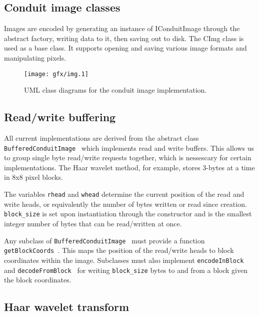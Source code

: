 \FloatBarrier
\subsection{Conduit image classes}

Images are encoded by generating an instance of IConduitImage through the abstract factory, writing data to it, then saving out to disk. The CImg class is used as a base class. It supports opening and saving various image formats and manipulating pixels.

    \begin{figure}[tbp]
        \begin{center}
                \texttt{[image: gfx/img.1]}
            \caption{UML class diagrams for the conduit image implementation.}
            \label{uml:img-classes}
        \end{center}
    \end{figure}
    


\FloatBarrier
\subsection{Read/write buffering}

All current implementations are derived from the abstract class {\tt BufferedConduitImage } which implements read and write buffers. This allows us to group single byte read/write requests together, which is nessescary for certain implementations. The Haar wavelet method, for example, stores 3-bytes at a time in 8x8 pixel blocks.

The variables {\tt rhead} and {\tt whead} determine the current position of the read and write heads, or equivalently the number of bytes written or read since creation. {\tt block\_size} is set upon instantiation through the constructor and is the smallest integer number of bytes that can be read/written at once.

Any subclass of {\tt BufferedConduitImage } must provide a function {\tt getBlockCoords }. This maps the position of the read/write heads to block coordinates within the image.  Subclasses must also implement {\tt encodeInBlock } and {\tt decodeFromBlock } for writing {\tt block\_size} bytes to and from a block given the block coordinates.
    
\FloatBarrier
\subsection{Haar wavelet transform}

